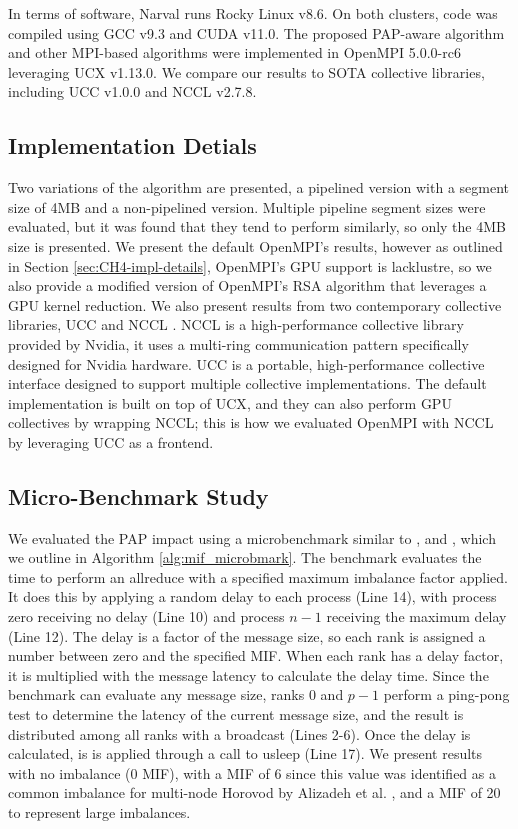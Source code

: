 In terms of software, Narval runs Rocky Linux v8.6.
On both clusters, code was compiled using GCC v9.3 and \gls{CUDA} v11.0.
The proposed \gls{PAP}-aware algorithm and other MPI-based algorithms were implemented in OpenMPI 5.0.0-rc6 leveraging \gls{UCX} v1.13.0. 
We compare our results to \gls{SOTA} collective libraries, including \gls{UCC} v1.0.0 and \gls{NCCL} v2.7.8.

\subsection{Implementation Detials}
Two variations of the algorithm are presented, a pipelined version with a segment size of 4MB and a non-pipelined version.
Multiple pipeline segment sizes were evaluated, but it was found that they tend to perform similarly, so only the 4MB size is presented.
We present the default OpenMPI's results, however as outlined in Section \ref{sec:CH4-impl-details}, OpenMPI's \gls{GPU} support is lacklustre, so we also provide a modified version of OpenMPI's \gls{RSA} algorithm that leverages a \gls{GPU} kernel reduction. 
We also present results from two contemporary collective libraries, \gls{UCC} \cite{UCC} and \gls{NCCL} \cite{NCCL}.
\gls{NCCL} is a high-performance collective library provided by Nvidia, it uses a multi-ring communication pattern specifically designed for Nvidia hardware.
\gls{UCC} is a portable, high-performance collective interface designed to support multiple collective implementations.
The default implementation is built on top of \gls{UCX}, and they can also perform \gls{GPU} collectives by wrapping \gls{NCCL}; this is how we evaluated OpenMPI with \gls{NCCL} by leveraging \gls{UCC} as a frontend.

\subsection{Micro-Benchmark Study}
We evaluated the \gls{PAP} impact using a microbenchmark similar to \cite{Faraj2008StudyProcArrivalMPIColl}, and \cite{Li2020DLPartialColl}, which we outline in Algorithm \ref{alg:mif_microbmark}.
The benchmark evaluates the time to perform an allreduce with a specified maximum imbalance factor applied.
It does this by applying a random delay to each process (Line 14), with process zero receiving no delay (Line 10) and process $n-1$ receiving the maximum delay (Line 12).
The delay is a factor of the message size, so each rank is assigned a number between zero and the specified MIF.
When each rank has a delay factor, it is multiplied with the message latency to calculate the delay time.
Since the benchmark can evaluate any message size, ranks 0 and $p-1$ perform a ping-pong test to determine the latency of the current message size, and the result is distributed among all ranks with a broadcast (Lines 2-6).
Once the delay is calculated, is is applied through a call to usleep (Line 17).
We present results with no imbalance (0 \gls{MIF}), with a \gls{MIF} of 6 since this value was identified as a common imbalance for multi-node Horovod by Alizadeh et al. \cite{Alizadeh2022PAPCollDL}, and a \gls{MIF} of 20 to represent large imbalances.

